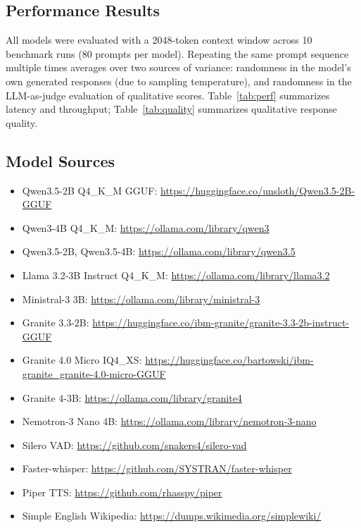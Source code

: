 \documentclass[11pt]{article}
\begin{document}
\subsection{Performance Results}

All models were evaluated with a 2048-token context window across 10 benchmark runs (80 prompts per model).
Repeating the same prompt sequence multiple times averages over two sources of variance: randomness in the model's own generated responses (due to sampling temperature), and randomness in the LLM-as-judge evaluation of qualitative scores.
Table~\ref{tab:perf} summarizes latency and throughput; Table~\ref{tab:quality} summarizes qualitative response quality.

\begin{table}[h]
\centering
\small

\caption{Performance benchmarks on Jetson Orin Nano (8\,GB, headless). Mean and p95 TTFT over 10 runs $\times$ 8 prompts = 80 samples per engine. All models use Q4\_K\_M quantization and 2048-token context. RAM is total allocation reported by the runtime including KV cache.}
\label{tab:perf}
\end{table}



\subsection{Model Sources}

\begin{itemize}[nosep]
  \item Qwen3.5-2B Q4\_K\_M GGUF: \url{https://huggingface.co/unsloth/Qwen3.5-2B-GGUF}
  \item Qwen3-4B Q4\_K\_M: \url{https://ollama.com/library/qwen3}
  \item Qwen3.5-2B, Qwen3.5-4B: \url{https://ollama.com/library/qwen3.5}
  \item Llama 3.2-3B Instruct Q4\_K\_M: \url{https://ollama.com/library/llama3.2}
  \item Ministral-3 3B: \url{https://ollama.com/library/ministral-3}
  \item Granite 3.3-2B: \url{https://huggingface.co/ibm-granite/granite-3.3-2b-instruct-GGUF}
  \item Granite 4.0 Micro IQ4\_XS: \url{https://huggingface.co/bartowski/ibm-granite_granite-4.0-micro-GGUF}
  \item Granite 4-3B: \url{https://ollama.com/library/granite4}
  \item Nemotron-3 Nano 4B: \url{https://ollama.com/library/nemotron-3-nano}
  \item Silero VAD: \url{https://github.com/snakers4/silero-vad}
  \item Faster-whisper: \url{https://github.com/SYSTRAN/faster-whisper}
  \item Piper TTS: \url{https://github.com/rhasspy/piper}
  \item Simple English Wikipedia: \url{https://dumps.wikimedia.org/simplewiki/}
\end{itemize}
\end{document}
